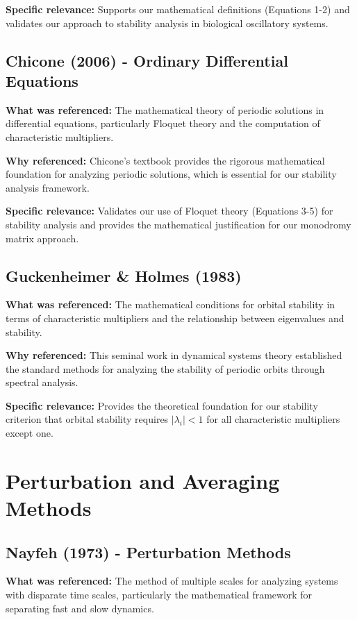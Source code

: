 \documentclass{article}
\begin{document}
\textbf{Specific relevance:} Supports our mathematical definitions (Equations 1-2) and validates our approach to stability analysis in biological oscillatory systems.

\subsection{Chicone (2006) - Ordinary Differential Equations}

\textbf{What was referenced:} The mathematical theory of periodic solutions in differential equations, particularly Floquet theory and the computation of characteristic multipliers.

\textbf{Why referenced:} Chicone's textbook provides the rigorous mathematical foundation for analyzing periodic solutions, which is essential for our stability analysis framework.

\textbf{Specific relevance:} Validates our use of Floquet theory (Equations 3-5) for stability analysis and provides the mathematical justification for our monodromy matrix approach.

\subsection{Guckenheimer \& Holmes (1983)}

\textbf{What was referenced:} The mathematical conditions for orbital stability in terms of characteristic multipliers and the relationship between eigenvalues and stability.

\textbf{Why referenced:} This seminal work in dynamical systems theory established the standard methods for analyzing the stability of periodic orbits through spectral analysis.

\textbf{Specific relevance:} Provides the theoretical foundation for our stability criterion that orbital stability requires $|\lambda_i| < 1$ for all characteristic multipliers except one.

\section{Perturbation and Averaging Methods}

\subsection{Nayfeh (1973) - Perturbation Methods}

\textbf{What was referenced:} The method of multiple scales for analyzing systems with disparate time scales, particularly the mathematical framework for separating fast and slow dynamics.
\end{document}
